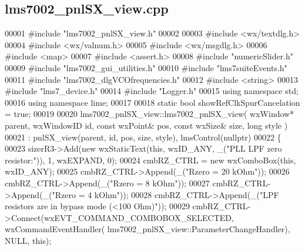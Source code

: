 \subsection{lms7002\+\_\+pnl\+S\+X\+\_\+view.\+cpp}
\label{lms7002__pnlSX__view_8cpp_source}

\begin{DoxyCode}
00001 \textcolor{preprocessor}{#include "lms7002_pnlSX_view.h"}
00002 
00003 \textcolor{preprocessor}{#include <wx/textdlg.h>}
00004 \textcolor{preprocessor}{#include <wx/valnum.h>}
00005 \textcolor{preprocessor}{#include <wx/msgdlg.h>}
00006 \textcolor{preprocessor}{#include <map>}
00007 \textcolor{preprocessor}{#include <assert.h>}
00008 \textcolor{preprocessor}{#include "numericSlider.h"}
00009 \textcolor{preprocessor}{#include "lms7002_gui_utilities.h"}
00010 \textcolor{preprocessor}{#include "lms7suiteEvents.h"}
00011 \textcolor{preprocessor}{#include "lms7002_dlgVCOfrequencies.h"}
00012 \textcolor{preprocessor}{#include <string>}
00013 \textcolor{preprocessor}{#include "lms7_device.h"}
00014 \textcolor{preprocessor}{#include "Logger.h"}
00015 \textcolor{keyword}{using namespace }std;
00016 \textcolor{keyword}{using namespace }lime;
00017 
00018 \textcolor{keyword}{static} \textcolor{keywordtype}{bool} showRefClkSpurCancelation = \textcolor{keyword}{true};
00019 
00020 lms7002_pnlSX_view::lms7002_pnlSX_view( wxWindow* parent, wxWindowID \textcolor{keywordtype}{id}, \textcolor{keyword}{const} wxPoint& pos, \textcolor{keyword}{const} wxSize& 
      size, \textcolor{keywordtype}{long} style )
00021     : pnlSX_view(parent, id, pos, size, style), lmsControl(nullptr)
00022 \{
00023     sizerR3->Add(\textcolor{keyword}{new} wxStaticText(\textcolor{keyword}{this}, wxID\_ANY, \_(\textcolor{stringliteral}{"PLL LPF zero resistor:"})), 1, wxEXPAND, 0);
00024     cmbRZ_CTRL = \textcolor{keyword}{new} wxComboBox(\textcolor{keyword}{this}, wxID\_ANY);
00025     cmbRZ_CTRL->Append(\_(\textcolor{stringliteral}{"Rzero = 20 kOhm"}));
00026     cmbRZ_CTRL->Append(\_(\textcolor{stringliteral}{"Rzero = 8 kOhm"}));
00027     cmbRZ_CTRL->Append(\_(\textcolor{stringliteral}{"Rzero = 4 kOhm"}));
00028     cmbRZ_CTRL->Append(\_(\textcolor{stringliteral}{"LPF resistors are in bypass mode (<100 Ohm)"}));
00029     cmbRZ_CTRL->Connect(wxEVT\_COMMAND\_COMBOBOX\_SELECTED, wxCommandEventHandler(
      lms7002_pnlSX_view::ParameterChangeHandler), NULL, \textcolor{keyword}{this});

\end{DoxyCode}
